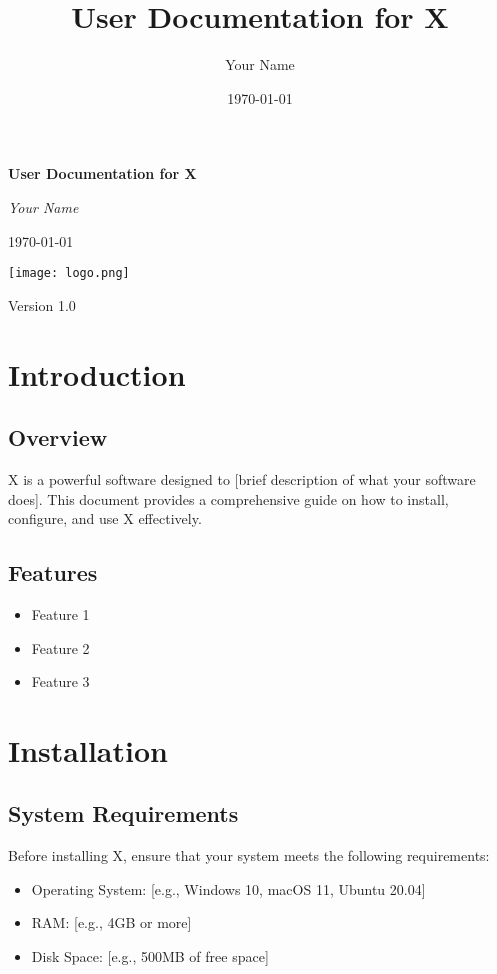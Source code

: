 \documentclass[a4paper,12pt]{article}
\title{User Documentation for X}
\author{Your Name}
\date{\today}
\begin{document}
\begin{titlepage}
    \centering
    \vspace*{2cm}
    {\Huge\bfseries User Documentation for X\par}
    \vspace{1.5cm}
    {\Large\itshape Your Name\par}
    \vspace{1.5cm}
    {\large \today\par}
    \vfill
    \texttt{[image: logo.png]} %
    \vfill
    {\large Version 1.0\par}
\end{titlepage}

\tableofcontents
\newpage

\section{Introduction}
\subsection{Overview}
X is a powerful software designed to [brief description of what your software does]. This document provides a comprehensive guide on how to install, configure, and use X effectively.

\subsection{Features}
\begin{itemize}
    \item Feature 1
    \item Feature 2
    \item Feature 3
\end{itemize}

\section{Installation}
\subsection{System Requirements}
Before installing X, ensure that your system meets the following requirements:
\begin{itemize}
    \item Operating System: [e.g., Windows 10, macOS 11, Ubuntu 20.04]
    \item RAM: [e.g., 4GB or more]
    \item Disk Space: [e.g., 500MB of free space]
\end{itemize}
\end{document}

